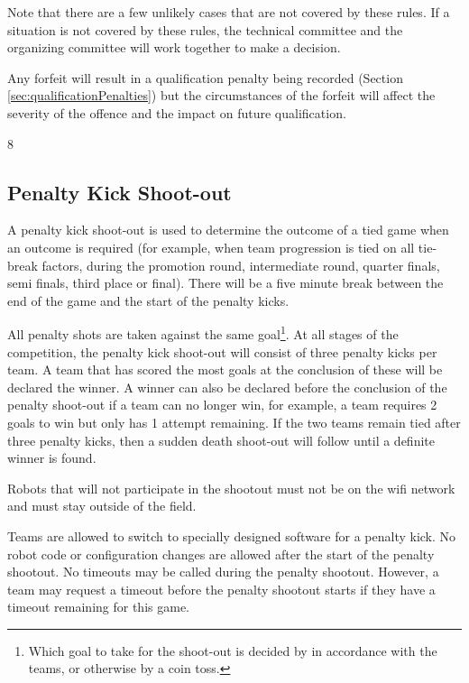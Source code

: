 \documentclass[12pt]{article}
\begin{document}
Note that there are a few unlikely cases that are not covered by these rules.  If a situation is not covered by these rules, the technical committee and the organizing committee will work together to make a decision.

Any forfeit will result in a qualification penalty being recorded (Section \ref{sec:qualificationPenalties}) but the circumstances of the forfeit will affect the severity of the offence and the impact on future qualification.

8\subsection{Penalty Kick Shoot-out}
\label{sec:penalty_shoot-out}

A penalty kick shoot-out is used to determine the outcome of a tied game when an outcome is required (for example, when team progression is tied on all tie-break factors, during the promotion round, intermediate round, quarter finals, semi finals, third place or final). 
There will be a five minute break between the end of the game and the start of the penalty kicks.

All penalty shots are taken against the same goal\footnote{Which goal to take for the shoot-out is decided by in accordance with the teams, or otherwise by a coin toss.}. 
At all stages of the competition, the penalty kick shoot-out will consist of three penalty kicks per team.
A team that has scored the most goals at the conclusion of these will be declared the winner. A winner can also be declared before the conclusion of the penalty shoot-out if a team can no longer win, for example, a team requires 2 goals to win but only has 1 attempt remaining. If the two teams remain tied after three penalty kicks, then a sudden death shoot-out will follow until a definite winner is found.

Robots that will not participate in the shootout must not be on the wifi network and must stay outside of the field.

Teams are allowed to switch to specially designed software for a penalty kick. No robot code or configuration changes are allowed after the start of the penalty shootout. No timeouts may be called during the penalty shootout. However, a team may request a timeout before the penalty shootout starts if they have a timeout remaining for this game. 
\end{document}
